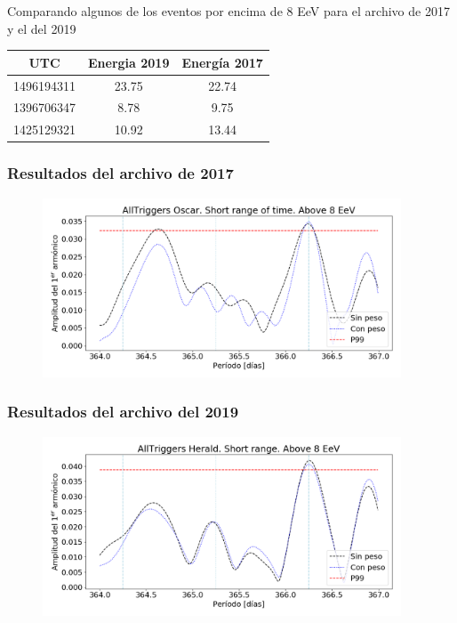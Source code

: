 				Comparando algunos de los eventos por encima de 8 EeV para el archivo de 2017 y el del 2019
				\begin{table}[H]
				\centering
				
					\begin{tabular}{c| c| c}
					UTC  		& Energia 2019 & Energía 2017\\ \hline
					1496194311	& 23.75			 &  22.74		\\
					1396706347	& 8.78			 & 	9.75		\\
					1425129321	& 10.92			 &  13.44		\\
					
					\end{tabular}
				\end{table}
				

			\subsubsection{Resultados del archivo de 2017}
			\begin{figure}[H]
				\centering
				\includegraphics[width=0.95\textwidth]{../Anisotropia/AllTriggers/AllTriggers_2017_Short_range_Above_8_EeV.png}
			\end{figure}
			\subsubsection{Resultados del archivo del 2019}
			\begin{figure}[H]
				\centering
				\includegraphics[width=0.95\textwidth]{../Anisotropia/AllTriggers/AllTriggers_2019_Short_range_Above_8_EeV.png}
			\end{figure}

